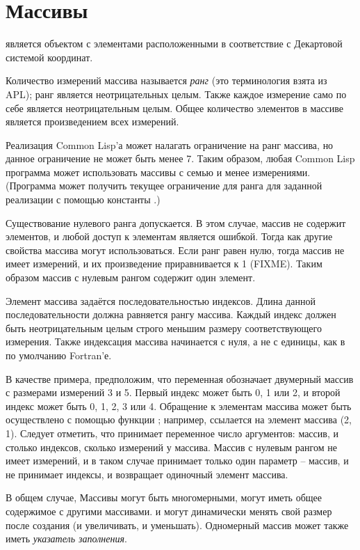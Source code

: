\section{Массивы}
\label{ARRAY-TYPE-SECTION}

 является объектом с элементами расположенными в соответствие с
Декартовой системой координат.

Количество измерений массива называется \emph{ранг} (это терминология взята из
APL); ранг является неотрицательных целым.
Также каждое измерение само по себе является неотрицательным целым.
Общее количество элементов в массиве является произведением всех измерений.

Реализация Common Lisp'а может налагать ограничение на ранг массива, но данное
ограничение не может быть менее 7. Таким образом, любая Common Lisp программа
может использовать массивы с семью и менее измерениями.
(Программа может получить текущее ограничение для ранга для заданной реализации
с помощью константы .)

Существование нулевого ранга допускается. В этом случае, массив не содержит
элементов, и любой доступ к элементам является ошибкой. Тогда как другие
свойства массива могут использоваться. Если ранг равен нулю, тогда массив не
имеет измерений, и их произведение приравнивается к 1 (FIXME).
Таким образом массив с нулевым рангом содержит один элемент.

Элемент массива задаётся последовательностью индексов.
Длина данной последовательности должна равняется рангу массива.
Каждый индекс должен быть неотрицательным целым строго меньшим размеру
соответствующего измерения. Также индексация массива начинается с нуля, а не с
единицы, как в по умолчанию Fortran'е.

В качестве примера, предположим, что переменная  обозначает двумерный
массив с размерами измерений 3 и 5. Первый индекс может быть 0, 1 или 2, и второй
индекс может быть 0, 1, 2, 3 или 4. Обращение к элементам массива может быть
осуществлено с помощью функции ; например, 
ссылается на элемент массива (2, 1). Следует отметить, что  принимает
переменное число аргументов: массив, и столько индексов, сколько измерений у
массива.
Массив с нулевым рангом не имеет измерений, и в таком случае  принимает
только один параметр -- массив, и не принимает индексы, и возвращает одиночный
элемент массива.

В общем случае, Массивы могут быть многомерными, могут иметь общее содержимое с
другими массивами. и могут динамически менять свой размер после создания (и
увеличивать, и уменьшать).
Одномерный массив может также иметь \emph{указатель заполнения}.

